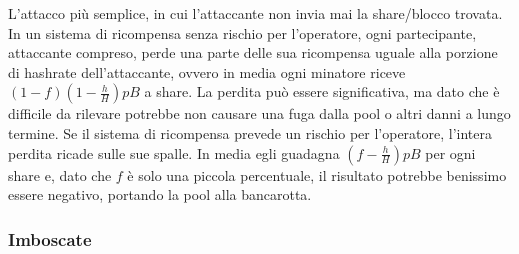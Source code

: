 L'attacco più semplice, in cui l'attaccante non invia mai la share/blocco trovata.
In un sistema di ricompensa senza rischio per l'operatore, ogni partecipante, attaccante compreso, perde una parte delle sua ricompensa uguale alla porzione di hashrate dell'attaccante, ovvero in media ogni minatore riceve $(1-f)\left(1-\frac{h}{H}\right)pB$ a share. La perdita può essere significativa, ma dato che è difficile da rilevare potrebbe non causare una fuga dalla pool o altri danni a lungo termine.
Se il sistema di ricompensa prevede un rischio per l'operatore, l'intera perdita ricade sulle sue spalle. In media egli guadagna $\left(f-\frac{h}{H}\right)pB$ per ogni share e, dato che $f$ è solo una piccola percentuale, il risultato potrebbe benissimo essere negativo, portando la pool alla bancarotta.

\subsubsection{Imboscate}

